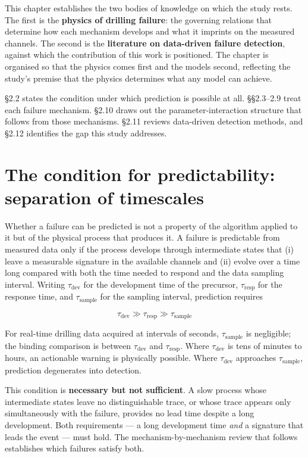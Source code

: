 \documentclass[12pt,a4paper]{report}
\begin{document}
This chapter establishes the two bodies of knowledge on which the study rests. The first is the \textbf{physics
of drilling failure}: the governing relations that determine how each mechanism develops and what it
imprints on the measured channels. The second is the \textbf{literature on data-driven failure detection},
against which the contribution of this work is positioned. The chapter is organised so that the physics
comes first and the models second, reflecting the study's premise that the physics determines what any
model can achieve.

§2.2 states the condition under which prediction is possible at all. §§2.3--2.9 treat each failure
mechanism. §2.10 draws out the parameter-interaction structure that follows from those mechanisms. §2.11
reviews data-driven detection methods, and §2.12 identifies the gap this study addresses.

\section{The condition for predictability: separation of timescales}

Whether a failure can be predicted is not a property of the algorithm applied to it but of the physical
process that produces it. A failure is predictable from measured data only if the process develops through
intermediate states that (i) leave a measurable signature in the available channels and (ii) evolve over a
time long compared with both the time needed to respond and the data sampling interval. Writing
$\tau_{\text{dev}}$ for the development time of the precursor, $\tau_{\text{resp}}$ for the response time,
and $\tau_{\text{sample}}$ for the sampling interval, prediction requires

\[\tau_{\text{dev}} \gg \tau_{\text{resp}} \gg \tau_{\text{sample}}\]

For real-time drilling data acquired at intervals of seconds, $\tau_{\text{sample}}$ is negligible; the
binding comparison is between $\tau_{\text{dev}}$ and $\tau_{\text{resp}}$. Where $\tau_{\text{dev}}$ is
tens of minutes to hours, an actionable warning is physically possible. Where $\tau_{\text{dev}}$
approaches $\tau_{\text{sample}}$, prediction degenerates into detection.

This condition is \textbf{necessary but not sufficient}. A slow process whose intermediate states leave no
distinguishable trace, or whose trace appears only simultaneously with the failure, provides no lead time
despite a long development. Both requirements --- a long development time \emph{and} a signature that leads the
event --- must hold. The mechanism-by-mechanism review that follows establishes which failures satisfy both.
\end{document}
